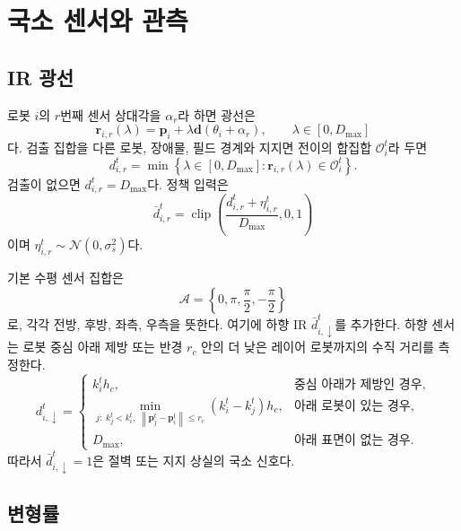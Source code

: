 \documentclass[11pt,a4paper]{article}
\newcommand{\norm}[1]{\left\lVert #1\right\rVert}
\newcommand{\clip}{\operatorname{clip}}
\begin{document}
\section{국소 센서와 관측}

\subsection{IR 광선}

로봇 \(i\)의 \(r\)번째 센서 상대각을 \(\alpha_r\)라 하면 광선은
\begin{equation}
  \bm{r}_{i,r}(\lambda)=
  \bm{p}_i+
  \lambda\bm{d}(\theta_i+\alpha_r),
  \qquad
  \lambda\in[0,D_{\max}]
\end{equation}
다. 검출 집합을 다른 로봇, 장애물, 필드 경계와 지지면 전이의 합집합 \(\mathcal{O}_i^t\)라 두면
\begin{equation}
  d_{i,r}^t=
  \min\left\{
    \lambda\in[0,D_{\max}]
    :\bm{r}_{i,r}(\lambda)\in\mathcal{O}_i^t
  \right\}.
\end{equation}
검출이 없으면 \(d_{i,r}^t=D_{\max}\)다. 정책 입력은
\begin{equation}
  \bar d_{i,r}^t=
  \clip\!\left(
    \frac{d_{i,r}^t+\eta_{i,r}^t}{D_{\max}},
    0,1
  \right)
\end{equation}
이며 \(\eta_{i,r}^t\sim\mathcal{N}(0,\sigma_s^2)\)다.

기본 수평 센서 집합은
\begin{equation}
  \mathcal{A}=
  \left\{
    0,\pi,\frac{\pi}{2},-\frac{\pi}{2}
  \right\}
\end{equation}
로, 각각 전방, 후방, 좌측, 우측을 뜻한다. 여기에 하향 IR
\(\bar d_{i,\downarrow}^t\)를 추가한다. 하향 센서는 로봇 중심 아래 제방 또는 반경
\(r_c\) 안의 더 낮은 레이어 로봇까지의 수직 거리를 측정한다.
\begin{equation}
  d_{i,\downarrow}^t=
  \begin{cases}
    k_i^t h_c, & \text{중심 아래가 제방인 경우},\\
    \min\limits_{j:\;k_j^t<k_i^t,\;
      \norm{\bm{p}_j^t-\bm{p}_i^t}\le r_c}
      (k_i^t-k_j^t)h_c, & \text{아래 로봇이 있는 경우},\\
    D_{\max}, & \text{아래 표면이 없는 경우}.
  \end{cases}
\end{equation}
따라서 \(\bar d_{i,\downarrow}^t=1\)은 절벽 또는 지지 상실의 국소 신호다.

\subsection{변형률}
\end{document}
